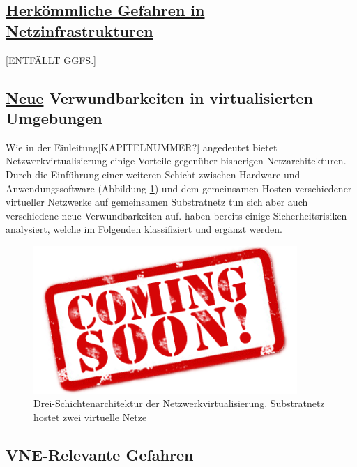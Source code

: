 \documentclass{lni}
\begin{document}
\subsection{\underline{Herkömmliche Gefahren in Netzinfrastrukturen}}
\label{subsec:gefahren_allg}
[ENTFÄLLT GGFS.]


\subsection{\underline{Neue} Verwundbarkeiten in virtualisierten Umgebungen}
\label{subsec:gefahren_virt}
Wie in der Einleitung[KAPITELNUMMER?] angedeutet bietet Netzwerkvirtualisierung einige Vorteile gegenüber bisherigen Netzarchitekturen. Durch die Einführung einer weiteren Schicht zwischen Hardware und Anwendungssoftware (Abbildung \ref{fig:gefahren_dreiEbenenDerVirtualisierung}) und dem gemeinsamen Hosten verschiedener virtueller Netzwerke auf gemeinsamen Substratnetz tun sich aber auch verschiedene neue Verwundbarkeiten auf. \cite{gong2016virtual, natarajansecurity, wu2010network, garfinkel2005virtual, dahbur2011survey} haben bereits einige Sicherheitsrisiken analysiert, welche im Folgenden klassifiziert und ergänzt werden.

\begin{figure}[htb]
  \begin{center}
    \includegraphics[width=10cm]{gefahren_dreiEbenenDerVirtualisierung.png}
    \caption{\label{fig:gefahren_dreiEbenenDerVirtualisierung} Drei-Schichtenarchitektur der Netzwerkvirtualisierung. \newline Substratnetz hostet zwei virtuelle Netze}
  \end{center}
\end{figure}





\subsection{VNE-Relevante Gefahren}
\label{subsec:gefahren_vnerelevant}	
\end{document}
